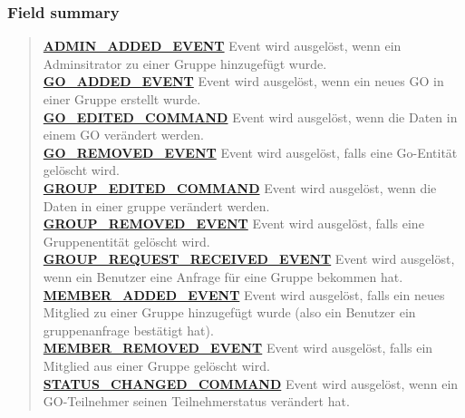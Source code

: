 \documentclass[11pt,a4paper]{article}
\begin{document}
{{{{{{{{{{{{{{{\subsubsection{Field summary}{
\begin{verse}
\hyperlink{edu.kit.pse17.go_app.ClientCommunication.Downstream.EventArg.ADMIN_ADDED_EVENT}{{\bf ADMIN\_ADDED\_EVENT}} Event wird ausgelöst, wenn ein Adminsitrator zu einer Gruppe hinzugefügt wurde.\\
\hyperlink{edu.kit.pse17.go_app.ClientCommunication.Downstream.EventArg.GO_ADDED_EVENT}{{\bf GO\_ADDED\_EVENT}} Event wird ausgelöst, wenn ein neues GO in einer Gruppe erstellt wurde.\\
\hyperlink{edu.kit.pse17.go_app.ClientCommunication.Downstream.EventArg.GO_EDITED_COMMAND}{{\bf GO\_EDITED\_COMMAND}} Event wird ausgelöst, wenn die Daten in einem GO verändert werden.\\
\hyperlink{edu.kit.pse17.go_app.ClientCommunication.Downstream.EventArg.GO_REMOVED_EVENT}{{\bf GO\_REMOVED\_EVENT}} Event wird ausgelöst, falls eine Go-Entität gelöscht wird.\\
\hyperlink{edu.kit.pse17.go_app.ClientCommunication.Downstream.EventArg.GROUP_EDITED_COMMAND}{{\bf GROUP\_EDITED\_COMMAND}} Event wird ausgelöst, wenn die Daten in einer gruppe verändert werden.\\
\hyperlink{edu.kit.pse17.go_app.ClientCommunication.Downstream.EventArg.GROUP_REMOVED_EVENT}{{\bf GROUP\_REMOVED\_EVENT}} Event wird ausgelöst, falls eine Gruppenentität gelöscht wird.\\
\hyperlink{edu.kit.pse17.go_app.ClientCommunication.Downstream.EventArg.GROUP_REQUEST_RECEIVED_EVENT}{{\bf GROUP\_REQUEST\_RECEIVED\_EVENT}} Event wird ausgelöst, wenn ein Benutzer eine Anfrage für eine Gruppe bekommen hat.\\
\hyperlink{edu.kit.pse17.go_app.ClientCommunication.Downstream.EventArg.MEMBER_ADDED_EVENT}{{\bf MEMBER\_ADDED\_EVENT}} Event wird ausgelöst, falls ein neues Mitglied zu einer Gruppe hinzugefügt wurde (also ein Benutzer ein gruppenanfrage bestätigt hat).\\
\hyperlink{edu.kit.pse17.go_app.ClientCommunication.Downstream.EventArg.MEMBER_REMOVED_EVENT}{{\bf MEMBER\_REMOVED\_EVENT}} Event wird ausgelöst, falls ein Mitglied aus einer Gruppe gelöscht wird.\\
\hyperlink{edu.kit.pse17.go_app.ClientCommunication.Downstream.EventArg.STATUS_CHANGED_COMMAND}{{\bf STATUS\_CHANGED\_COMMAND}} Event wird ausgelöst, wenn ein GO-Teilnehmer seinen Teilnehmerstatus verändert hat.\\
\end{verse}
}
}}}}}}}}}}}}}}}
\end{document}
